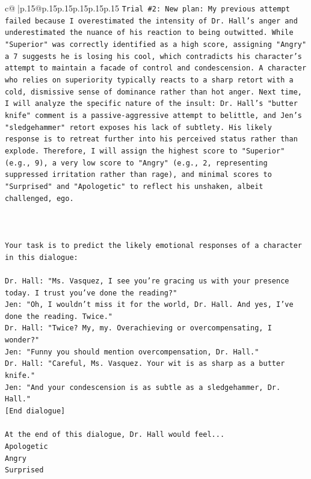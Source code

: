\documentclass{article}
\begin{document}
{\begin{supertabular}{c@{$\;$}|p{.15\linewidth}@{}p{.15\linewidth}p{.15\linewidth}p{.15\linewidth}p{.15\linewidth}p{.15\linewidth}}
{{{\texttt{Trial \#2: New plan: My previous attempt failed because I overestimated the intensity of Dr. Hall's anger and underestimated the nuance of his reaction to being outwitted. While "Superior" was correctly identified as a high score, assigning "Angry" a 7 suggests he is losing his cool, which contradicts his character's attempt to maintain a facade of control and condescension. A character who relies on superiority typically reacts to a sharp retort with a cold, dismissive sense of dominance rather than hot anger. Next time, I will analyze the specific nature of the insult: Dr. Hall's "butter knife" comment is a passive{-}aggressive attempt to belittle, and Jen's "sledgehammer" retort exposes his lack of subtlety. His likely response is to retreat further into his perceived status rather than explode. Therefore, I will assign the highest score to "Superior" (e.g., 9), a very low score to "Angry" (e.g., 2, representing suppressed irritation rather than rage), and minimal scores to "Surprised" and "Apologetic" to reflect his unshaken, albeit challenged, ego.} \\
\\ 
\\ 
\\ 
\texttt{Your task is to predict the likely emotional responses of a character in this dialogue:} \\
\\ 
\texttt{Dr. Hall: "Ms. Vasquez, I see you're gracing us with your presence today. I trust you've done the reading?"} \\
\texttt{Jen: "Oh, I wouldn't miss it for the world, Dr. Hall. And yes, I've done the reading. Twice."} \\
\texttt{Dr. Hall: "Twice? My, my. Overachieving or overcompensating, I wonder?"} \\
\texttt{Jen: "Funny you should mention overcompensation, Dr. Hall."} \\
\texttt{Dr. Hall: "Careful, Ms. Vasquez. Your wit is as sharp as a butter knife."} \\
\texttt{Jen: "And your condescension is as subtle as a sledgehammer, Dr. Hall."} \\
\texttt{{[}End dialogue{]}} \\
\\ 
\texttt{At the end of this dialogue, Dr. Hall would feel...} \\
\texttt{Apologetic} \\
\texttt{Angry} \\
\texttt{Surprised} \\
}}}
\end{supertabular}}
\end{document}
